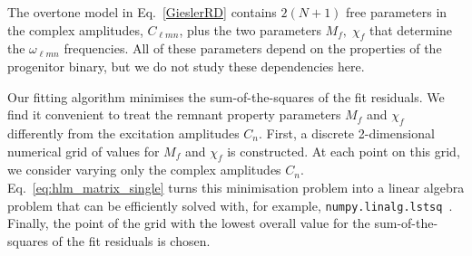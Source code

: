 The overtone model in Eq.~\ref{GieslerRD} contains $2(N+1)$ free parameters in the complex amplitudes, $C_{\ell m n}$, plus the two parameters $M_f,\; \chi_f$ that determine the $\omega_{\ell m n}$ frequencies.
All of these parameters depend on the properties of the progenitor binary, but we do not study these dependencies here.


Our fitting algorithm minimises the sum-of-the-squares of the fit residuals. %
We find it convenient to treat the remnant property parameters $M_f$ and $\chi_f$ differently from the excitation amplitudes $C_n$. 
First, a discrete 2-dimensional numerical grid of values for $M_f$ and $\chi_f$ is constructed.
At each point on this grid, we consider varying only the complex amplitudes $C_n$. 
Eq.~\ref{eq:hlm_matrix_single} turns this minimisation problem into a linear algebra problem that can be efficiently solved with, for example, \texttt{numpy.linalg.lstsq}~\cite{Harris:2020xlr}.
Finally, the point of the grid with the lowest overall value for the sum-of-the-squares of the fit residuals is chosen.

